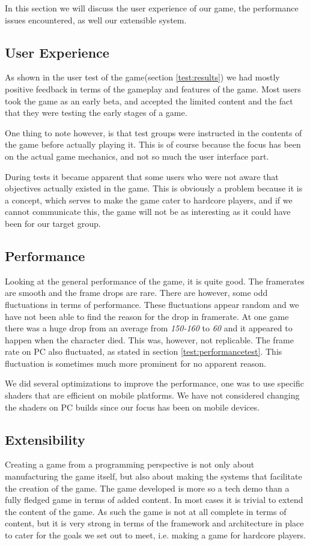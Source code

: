 In this section we will discuss the user experience of our game, the performance issues encountered, as well our extensible system.

\subsection{User Experience}
As shown in the user test of the game(section \ref{test:results}) we had mostly positive feedback in terms of the gameplay and features of the game.
Most users took the game as an early beta, and accepted the limited content and the fact that they were testing the early stages of a game.

One thing to note however, is that test groups were instructed in the contents of the game before actually playing it.
This is of course because the focus has been on the actual game mechanics, and not so much the user interface part.

During tests it became apparent that some users who were not aware that objectives actually existed in the game.
This is obviously a problem because it is a concept, which serves to make the game cater to hardcore players, and if we cannot communicate this, the game will not be as interesting as it could have been for our target group.

\subsection{Performance}
Looking at the general performance of the game, it is quite good. 
The framerates are smooth and the frame drops are rare. 
There are however, some odd fluctuations in terms of performance. 
These fluctuations appear random and we have not been able to find the reason for the drop in framerate. 
At one game there was a huge drop from an average from \emph{150-160} to \emph{60} and it appeared to happen when the character died. This was, however, not replicable. 
The frame rate on PC also fluctuated, as stated in section \ref{test:performancetest}. 
This fluctuation is sometimes much more prominent for no apparent reason.

We did several optimizations to improve the performance, one was to use specific shaders that are efficient on mobile platforms.
We have not considered changing the shaders on PC builds since our focus has been on mobile devices.

\subsection{Extensibility}
Creating a game from a programming perspective is not only about manufacturing the game itself, but also about making the systems that facilitate the creation of the game.
The game developed is more so a tech demo than a fully fledged game in terms of added content.
In most cases it is trivial to extend the content of the game. 
As such the game is not at all complete in terms of content, but it is very strong in terms of the framework and architecture in place to cater for the goals we set out to meet, i.e. making a game for hardcore players.

